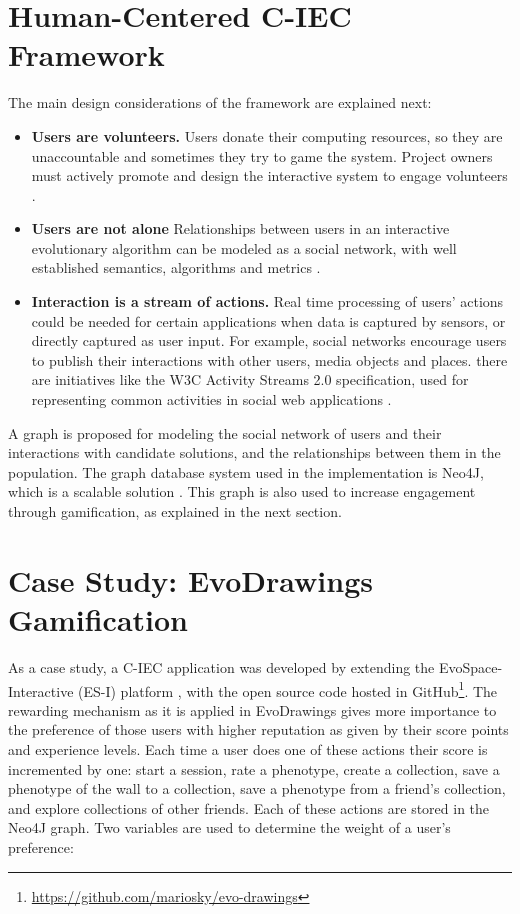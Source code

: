 \section{Human-Centered C-IEC Framework}
\label{sec:framework} 
The main design considerations of the framework are explained next: 
\begin{itemize}
\item {\bf Users are volunteers.} Users donate their computing resources, so they are 
unaccountable and sometimes they try to game the system. Project owners must actively promote and
design the interactive system to engage volunteers \cite{oh2015clicking}. %
\item {\bf Users are not alone}
  Relationships between users in an interactive evolutionary algorithm can be modeled
  as a social network, with well established semantics, algorithms and metrics 
  \cite{ahuja1993network}. 
\item {\bf Interaction is a stream of actions.}
  Real time processing of users' actions could be needed for certain applications when data is 
  captured by sensors, or directly captured as user input. For example, social networks encourage
  users to publish their interactions with other users, media objects and places.
  there are initiatives like the W3C Activity Streams 2.0  specification, used for 
  representing common activities in social web applications \cite{json:streams}. 
\end{itemize}

A graph is proposed for modeling the social network of users and their interactions 
with candidate solutions, and the relationships between them in the population.
The graph database system used in the implementation is Neo4J, which is a scalable solution 
\cite{miller2013graph,holzschuher2013performance}. 
This graph is also used to increase engagement through gamification, as explained in the next section.


\section{Case Study: EvoDrawings Gamification}
\label{sec:evodraw}
As a case study, a C-IEC application was developed by extending the 
EvoSpace-Interactive (ES-I) platform \cite{garcia2013evospace}, 
with the open source code hosted in GitHub\footnote{\url{https://github.com/mariosky/evo-drawings}}.
The rewarding 
mechanism as it is applied in EvoDrawings gives more importance 
to the preference of those users with higher reputation
as given by their score points and experience levels.  
Each time a user does one of these actions their score is incremented by one:
start a session, rate a phenotype, create a collection, save a phenotype of 
the wall to a collection, save a phenotype from a friend's collection, and
explore collections of other friends. Each of these actions are stored in
the Neo4J graph. Two variables are used to determine the weight of a user's 
preference:

